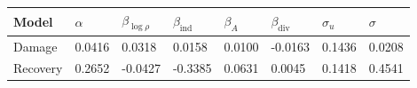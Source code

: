 \begin{tabular}{llllllll}
\toprule
Model & $\alpha$ & $\beta_{\log\rho}$ & $\beta_{\mathrm{ind}}$ & $\beta_{A}$ & $\beta_{\mathrm{div}}$ & $\sigma_u$ & $\sigma$ \\
\midrule
Damage & 0.0416 & 0.0318 & 0.0158 & 0.0100 & -0.0163 & 0.1436 & 0.0208 \\
Recovery & 0.2652 & -0.0427 & -0.3385 & 0.0631 & 0.0045 & 0.1418 & 0.4541 \\
\bottomrule
\end{tabular}
